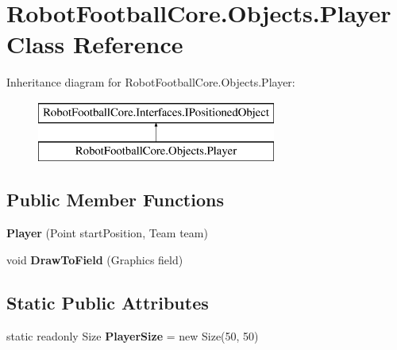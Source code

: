 \hypertarget{class_robot_football_core_1_1_objects_1_1_player}{\section{Robot\-Football\-Core.\-Objects.\-Player Class Reference}
\label{class_robot_football_core_1_1_objects_1_1_player}
}
Inheritance diagram for Robot\-Football\-Core.\-Objects.\-Player\-:\begin{figure}[H]
\begin{center}
\leavevmode
\includegraphics[height=2.000000cm]{class_robot_football_core_1_1_objects_1_1_player}
\end{center}
\end{figure}
\subsection*{Public Member Functions}
\begin{DoxyCompactItemize}
\item 
\hypertarget{class_robot_football_core_1_1_objects_1_1_player_a41e3e8cfbbed98deecb9082217777e16}{{\bfseries Player} (Point start\-Position, Team team)}\label{class_robot_football_core_1_1_objects_1_1_player_a41e3e8cfbbed98deecb9082217777e16}

\item 
\hypertarget{class_robot_football_core_1_1_objects_1_1_player_a705688104c303b9c81d78712d4eb226c}{void {\bfseries Draw\-To\-Field} (Graphics field)}\label{class_robot_football_core_1_1_objects_1_1_player_a705688104c303b9c81d78712d4eb226c}

\end{DoxyCompactItemize}
\subsection*{Static Public Attributes}
\begin{DoxyCompactItemize}
\item 
\hypertarget{class_robot_football_core_1_1_objects_1_1_player_a948ced89330a7be60bb65d43b8b1dcfb}{static readonly Size {\bfseries Player\-Size} = new Size(50, 50)}\label{class_robot_football_core_1_1_objects_1_1_player_a948ced89330a7be60bb65d43b8b1dcfb}

\end{DoxyCompactItemize}
